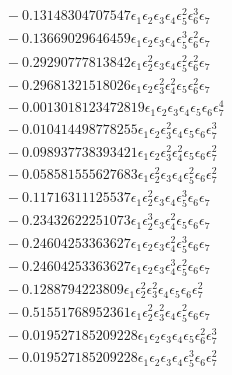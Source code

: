 \documentclass[10pt]{article}
\begin{document}
\begin{align*}
&{}  - 0.13148304707547 \epsilon_{1} \epsilon_{2} \epsilon_{3} \epsilon_{4} \epsilon_{5}^{2} \epsilon_{6}^{3} \epsilon_{7} \\
&{}  - 0.13669029646459 \epsilon_{1} \epsilon_{2} \epsilon_{3} \epsilon_{4} \epsilon_{5}^{3} \epsilon_{6}^{2} \epsilon_{7} \\
&{}  - 0.29290777813842 \epsilon_{1} \epsilon_{2}^{2} \epsilon_{3} \epsilon_{4} \epsilon_{5}^{2} \epsilon_{6}^{2} \epsilon_{7} \\
&{}  - 0.29681321518026 \epsilon_{1} \epsilon_{2} \epsilon_{3}^{2} \epsilon_{4}^{2} \epsilon_{5} \epsilon_{6}^{2} \epsilon_{7} \\
&{}  - 0.0013018123472819 \epsilon_{1} \epsilon_{2} \epsilon_{3} \epsilon_{4} \epsilon_{5} \epsilon_{6} \epsilon_{7}^{4} \\
&{}  - 0.010414498778255 \epsilon_{1} \epsilon_{2} \epsilon_{3}^{2} \epsilon_{4} \epsilon_{5} \epsilon_{6} \epsilon_{7}^{3} \\
&{}  - 0.098937738393421 \epsilon_{1} \epsilon_{2} \epsilon_{3}^{2} \epsilon_{4}^{2} \epsilon_{5} \epsilon_{6} \epsilon_{7}^{2} \\
&{}  - 0.058581555627683 \epsilon_{1} \epsilon_{2}^{2} \epsilon_{3} \epsilon_{4} \epsilon_{5}^{2} \epsilon_{6} \epsilon_{7}^{2} \\
&{}  - 0.11716311125537 \epsilon_{1} \epsilon_{2}^{2} \epsilon_{3} \epsilon_{4} \epsilon_{5}^{3} \epsilon_{6} \epsilon_{7} \\
&{}  - 0.23432622251073 \epsilon_{1} \epsilon_{2}^{3} \epsilon_{3} \epsilon_{4}^{2} \epsilon_{5} \epsilon_{6} \epsilon_{7} \\
&{}  - 0.24604253363627 \epsilon_{1} \epsilon_{2} \epsilon_{3} \epsilon_{4}^{2} \epsilon_{5}^{3} \epsilon_{6} \epsilon_{7} \\
&{}  - 0.24604253363627 \epsilon_{1} \epsilon_{2} \epsilon_{3} \epsilon_{4}^{3} \epsilon_{5}^{2} \epsilon_{6} \epsilon_{7} \\
&{}  - 0.1288794223809 \epsilon_{1} \epsilon_{2}^{2} \epsilon_{3}^{2} \epsilon_{4} \epsilon_{5} \epsilon_{6} \epsilon_{7}^{2} \\
&{}  - 0.51551768952361 \epsilon_{1} \epsilon_{2}^{2} \epsilon_{3}^{2} \epsilon_{4} \epsilon_{5}^{2} \epsilon_{6} \epsilon_{7} \\
&{}  - 0.019527185209228 \epsilon_{1} \epsilon_{2} \epsilon_{3} \epsilon_{4} \epsilon_{5} \epsilon_{6}^{2} \epsilon_{7}^{3} \\
&{}  - 0.019527185209228 \epsilon_{1} \epsilon_{2} \epsilon_{3} \epsilon_{4} \epsilon_{5}^{3} \epsilon_{6} \epsilon_{7}^{2} \\

\end{align*}
\end{document}
